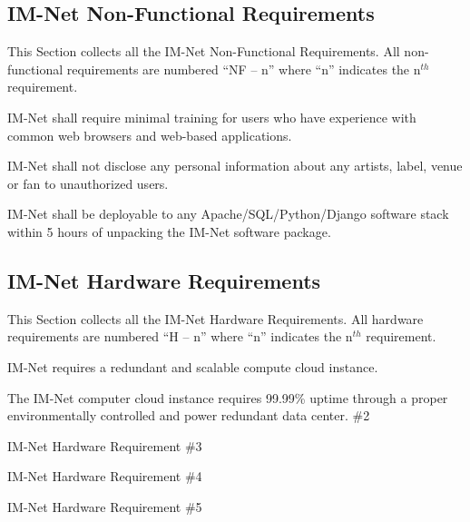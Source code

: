 \documentclass[letterpaper,12pt]{article}
\newcounter{qcounter}						%
\begin{document}
{\textcolor{subsection}{\subsection{IM-Net Non-Functional Requirements}}

This Section collects all the IM-Net Non-Functional Requirements. All non-functional requirements are numbered ``NF -- n'' where ``n'' indicates the n${}^{th}$ requirement.

\begin{list}{NF -- :~}{}

\item  IM-Net shall require minimal training for users who have experience with common web browsers and web-based applications.

\item  IM-Net shall not disclose any personal information about any artists, label, venue or fan to unauthorized users.

\item  IM-Net shall be deployable to any Apache/SQL/Python/Django software stack within 5 hours of unpacking the IM-Net software package.

\end{list}

\textcolor{subsection}{\subsection{IM-Net Hardware Requirements}}

This Section collects all the IM-Net Hardware Requirements. All hardware requirements are numbered ``H -- n'' where ``n'' indicates the n${}^{th}$ requirement.

\begin{list}{H -- :~}{}

\item  IM-Net requires a redundant and scalable compute cloud instance.

\item  The IM-Net computer cloud instance requires 99.99\% uptime through a proper environmentally controlled and power redundant data center. \#2

\item  IM-Net Hardware Requirement \#3

\item  IM-Net Hardware Requirement \#4

\item  IM-Net Hardware Requirement \#5


\end{list}}
\end{document}
